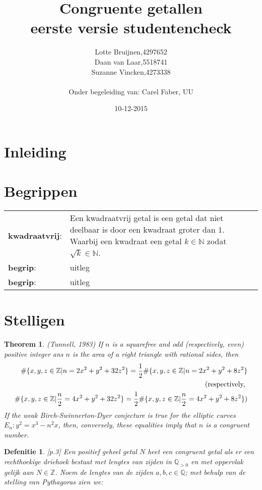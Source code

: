 \documentclass[12pt,reqno]{article}
\title{\textbf{Congruente getallen}\\
		\small{eerste versie studentencheck}}
\author{
	\begin{tabular}{ l l }
		Lotte Bruijnen, & 4297652 \\
		Daan van Laar, & 5518741 \\
		Suzanne Vincken, & 4273338
	\end{tabular}\\
	Onder begeleiding van: Carel Faber, UU
}
\date{10-12-2015}
\newcommand*{\NN}{\ensuremath{\mathbb{N}}}
\newcommand*{\ZZ}{\ensuremath{\mathbb{Z}}}
\newcommand*{\QQ}{\ensuremath{\mathbb{Q}}}
\begin{document}
	
	\maketitle
	\allowdisplaybreaks
	
	\section{Inleiding}
	
	\section{Begrippen}
	\begin{tabular}{ l p{10cm} }
		\textbf{kwadraatvrij}: \cite{Beukers} & Een kwadraatvrij getal is een getal dat niet deelbaar is door een kwadraat groter dan $1$. Waarbij een kwadraat een getal $k\in\NN$ zodat $\sqrt{k}\in\NN$.\\
		\textbf{begrip}: & uitleg \\
		\textbf{begrip}: & uitleg
	\end{tabular}
	
	\section{Stelligen}
	
	\newtheorem{Tunnell}{Theorem}
	\begin{Tunnell}
		\cite{Koblitz} (Tunnell, 1983) If $n$ is a squarefree and odd (respectively, even) positive integer ans $n$ is the area of a right triangle with rational sides, then
		\begin{align}
		\#\{x,y,z\in\ZZ|n=2x^2+y^2+32z^2\} = \frac{1}{2}\#\{x,y,z\in\ZZ|n=2x^2+y^2+8z^2\}\\
		\notag \text{(respectively, } \\
		\#\{x,y,z\in\ZZ|\frac{n}{2}=4x^2+y^2+32z^2\} = \frac{1}{2}\#\{x,y,z\in\ZZ|\frac{n}{2}=4x^2+y^2+8z^2\})
		\end{align}
		If the weak Birch-Swinnerton-Dyer conjecture is true for the elliptic curves $E_n:y^2=x^3-n^2x$, then, conversely, these equalities imply that $n$ is a congruent number.
	\end{Tunnell}
	
	\newtheorem{CG}{Defenitie}
	\begin{CG}
		\cite{Oort}[p.3] Een positief geheel getal $N$ heet een congruent getal als er een rechthoekige driehoek bestaat met lengtes van zijden in $\QQ_{>0}$ en met oppervlak gelijk aan $N\in\ZZ$. Noem de lengtes van de zijden $a,b,c\in\QQ$; met behulp van de stelling van Pythagoras zien we:
		
	\end{CG}
	
\end{document}
